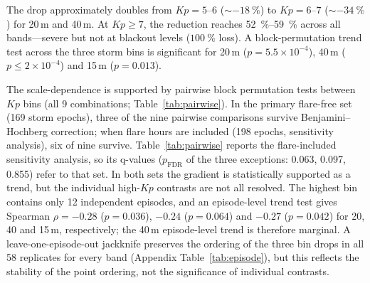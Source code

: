 \documentclass{agujournal2019}
\begin{document}
The drop approximately doubles from $Kp = 5\text{--}6$
($\sim\SI{-18}{\percent}$) to $Kp = 6\text{--}7$ ($\sim\SI{-34}{\percent}$)
for 20\,m and 40\,m. At $Kp \ge 7$, the reduction reaches
\SIrange{52}{59}{\percent} across all bands---severe but not at blackout
levels ($\SI{100}{\percent}$ loss). A block-permutation trend test across
the three storm bins is significant for 20\,m ($p = 5.5\times10^{-4}$),
40\,m ($p \le 2\times10^{-4}$) and 15\,m ($p = 0.013$).

The scale-dependence is supported by pairwise block permutation tests between
$Kp$ bins (all 9 combinations; Table~\ref{tab:pairwise}). In the primary
flare-free set (169 storm epochs), three of the nine pairwise comparisons
survive Benjamini--Hochberg correction; when flare hours are included (198
epochs, sensitivity analysis), six of nine survive. Table~\ref{tab:pairwise}
reports the flare-included sensitivity analysis, so its q-values
($p_{\text{FDR}}$ of the three exceptions: 0.063, 0.097, 0.855) refer to
that set. In both sets the gradient is statistically supported as a trend, but
the individual high-$Kp$ contrasts are not all resolved. The highest bin
contains only 12 independent episodes, and an episode-level trend test gives
Spearman $\rho = -0.28$ ($p = 0.036$), $-0.24$ ($p = 0.064$) and $-0.27$
($p = 0.042$) for 20, 40 and 15\,m, respectively; the 40\,m episode-level
trend is therefore marginal. A leave-one-episode-out jackknife preserves the
ordering of the three bin drops in all 58 replicates for every band
(Appendix Table~\ref{tab:episode}), but this reflects the stability of the
point ordering, not the significance of individual contrasts.
\end{document}

